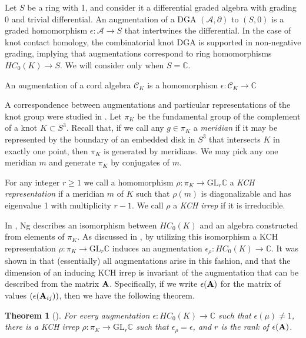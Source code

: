 \documentclass[11pt]{amsart}
\def\C{{\mathbb C}}
\def\A{{\mathcal A}}
\newtheorem{thm}{Theorem}[section]
\newenvironment{definition}[1][Definition]{\begin{trivlist}
\item[\hskip \labelsep {\bfseries #1}]}{\end{trivlist}}
\begin{document}
  Let $S$ be a ring with 1, and consider it a differential graded algebra with grading 0 and trivial differential. An augmentation of a DGA $(\A,\partial)$ to $(S,0)$ is a graded homomorphism $\epsilon:\A\to S$ that intertwines the differential. In the case of knot contact homology, the combinatorial knot DGA is supported in non-negative grading, implying that augmentations correspond to ring homomorphisms $HC_0(K)\to S$. We will consider only when $S=\C$.

  \begin{definition}
  An {\emph augmentation} of a cord algebra $\mathcal{C}_K$ is a homomorphism $\epsilon\colon \mathcal{C}_K\rightarrow \C$
  \end{definition}

  A correspondence between augmentations and particular representations of the knot group were studied in \cite{Cor13b}. Let $\pi_K$ be the fundamental group of the complement of a knot $K\subset S^3$. Recall that, if we call any $g\in\pi_K$ a \emph{meridian} if it may be represented by the boundary of an embedded disk in $S^3$ that intersects $K$ in exactly one point, then $\pi_K$ is generated by meridians. We may pick any one meridian $m$ and generate $\pi_K$ by conjugates of $m$.

  \begin{definition}
  For any integer $r\ge1$ we call a homomorphism $\rho:\pi_K\to\text{GL}_r\C$ a \emph{KCH representation} if a meridian $m$ of $K$ such that $\rho(m)$ is diagonalizable and has eigenvalue 1 with multiplicity $r-1$. We call $\rho$ a \emph{KCH irrep} if it is irreducible.
  \label{defn:KCHReps}
  \end{definition}

  In \cite{Ng08}, Ng describes an isomorphism between $HC_0(K)$ and an algebra constructed from elements of $\pi_K$. As discussed in \cite{Ng12}, by utilizing this isomorphism a KCH representation $\rho:\pi_K\to\text{GL}_r\C$ induces an augmentation $\epsilon_\rho:HC_0(K)\to\C$. It was shown in \cite{Cor13b} that (essentially) all augmentations arise in this fashion, and that the dimension of an inducing KCH irrep is invariant of the augmentation that can be described from the matrix ${\bf A}$. Specifically, if we write $\epsilon({\bf A})$ for the matrix of values $(\epsilon({\bf A}_{ij}))$, then we have the following theorem.

  \begin{thm}[\cite{Cor13b}]
  For every augmentation $\epsilon:HC_0(K)\to\C$ such that $\epsilon(\mu)\ne 1$, there is a KCH irrep $\rho:\pi_K\to\text{GL}_r\C$ such that $\epsilon_\rho=\epsilon$, and $r$ is the rank of $\epsilon({\bf A})$.
  \label{thm:AugKCH_Corresp}
  \end{thm}
\end{document}
